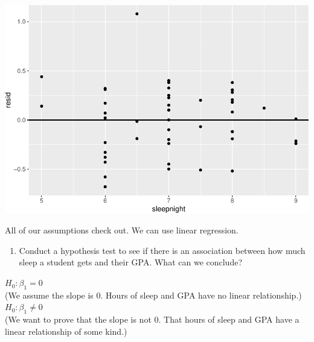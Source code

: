 \documentclass[]{article}
\newenvironment{Shaded}{\begin{snugshade}}{\end{snugshade}}
\newcommand{\DataTypeTok}[1]{\textcolor[rgb]{0.13,0.29,0.53}{#1}}
\newcommand{\DecValTok}[1]{\textcolor[rgb]{0.00,0.00,0.81}{#1}}
\newcommand{\KeywordTok}[1]{\textcolor[rgb]{0.13,0.29,0.53}{\textbf{#1}}}
\newcommand{\NormalTok}[1]{#1}
\newcommand{\OperatorTok}[1]{\textcolor[rgb]{0.81,0.36,0.00}{\textbf{#1}}}
\newcommand{\StringTok}[1]{\textcolor[rgb]{0.31,0.60,0.02}{#1}}
\providecommand{\tightlist}{%
  \setlength{\itemsep}{0pt}\setlength{\parskip}{0pt}}
\begin{document}
\begin{Shaded}
\end{Shaded}

\includegraphics{lab-8-regression_files/figure-latex/unnamed-chunk-8-1.pdf}

All of our assumptions check out. We can use linear regression.

\newpage

\begin{enumerate}
\def\labelenumi{\arabic{enumi}.}
\setcounter{enumi}{7}
\tightlist
\item
  Conduct a hypothesis test to see if there is an association between
  how much sleep a student gets and their GPA. What can we conclude?
\end{enumerate}

\(H_0: \beta_1 = 0\)\\
(We assume the slope is 0. Hours of sleep and GPA have no linear
relationship.)\\
\(H_0: \beta_1\ne0\)\\
(We want to prove that the slope is not 0. That hours of sleep and GPA
have a linear relationship of some kind.)

\begin{Shaded}
\end{Shaded}
\end{document}
